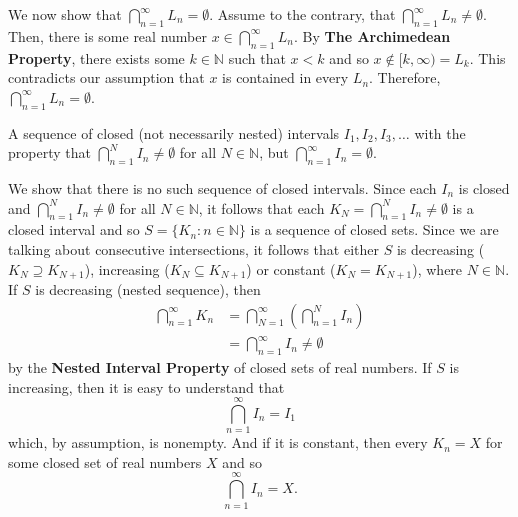 \documentclass[12pt]{article}
\newcommand{\N}{\mathbb{N}}
\newenvironment{problem}[2][Problem]{\begin{trivlist}
		\item[\hskip \labelsep {\bfseries #1}\hskip \labelsep {\bfseries #2.}]}{\end{trivlist}}
\newenvironment{solution}[2][Solution]{\begin{trivlist}
		\item[\hskip \labelsep {\bfseries #1}\hskip \labelsep {\bfseries #2.}]}{\end{trivlist}}
\begin{document}
\begin{problem}{1.4.8}
\begin{enumerate}[label=(\alph*)]
\begin{solution}{(c)}
				We now show that $\bigcap_{n=1}^{\infty} L_{n} = \emptyset$. Assume to the contrary, that $\bigcap_{n=1}^{\infty} L_{n} \neq \emptyset$. Then, there is some real number $x\in \bigcap_{n=1}^{\infty} L_{n}$. By \textbf{The Archimedean Property}, there exists some $k\in \N$ such that $x<k$ and so $x\not\in [k,\infty) = L_{k}$. This contradicts our assumption that $x$ is contained in every $L_{n}$. Therefore, $\bigcap_{n=1}^{\infty} L_{n} = \emptyset$.
			\end{solution}
			\item A sequence of closed (not necessarily nested) intervals $I_{1},I_{2},I_{3},\ldots$ with the property that $\bigcap_{n=1}^{N} I_{n} \neq \emptyset$ for all $N\in \N$, but $\bigcap_{n=1}^{\infty} I_{n} = \emptyset$.
			\begin{solution}{(c)}
				We show that there is no such sequence of closed intervals. Since each $I_{n}$ is closed and $\bigcap_{n=1}^{N} I_{n} \neq \emptyset$ for all $N\in \N$, it follows that each $K_{N} = \bigcap_{n=1}^{N} I_{n} \neq \emptyset$ is a closed interval and so $S=\{K_{n}:n\in \N\}$ is a sequence of closed sets. Since we are talking about consecutive intersections, it follows that either $S$ is decreasing ($K_{N}\supseteq K_{N+1}$), increasing ($K_{N}\subseteq K_{N+1}$) or constant ($K_{N} = K_{N+1}$), where $N\in \N$. If $S$ is decreasing (nested sequence), then  
				\begin{align*}
					\bigcap_{n=1}^{\infty} K_{n} &= \bigcap_{N=1}^{\infty} \left(\bigcap_{n=1}^{N} I_{n}\right)\\
					&= \bigcap_{n=1}^{\infty}I_{n} \neq \emptyset 
				\end{align*} 
			by the \textbf{Nested Interval Property} of closed sets of  real numbers. If $S$ is increasing, then it is easy to understand that
			\begin{equation*}
				\bigcap_{n=1}^{\infty}I_{n} = I_{1}
			\end{equation*}
		which, by assumption, is nonempty. And if it is constant, then every $K_{n} = X$ for some closed set of real numbers $X$ and so
		\begin{equation*}
		\bigcap_{n=1}^{\infty}I_{n} = X.
		\end{equation*}
			\end{solution}
		\end{enumerate}
	\end{problem}
\end{document}
